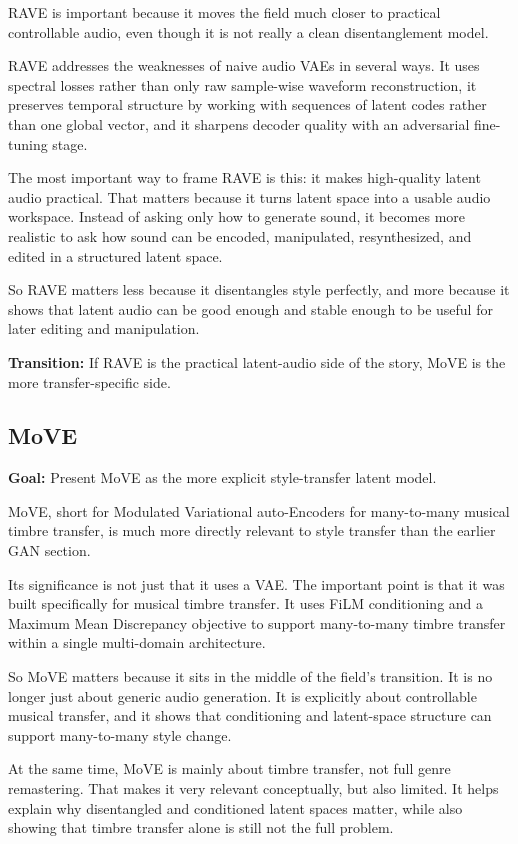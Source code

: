 \documentclass[11pt]{article}
\begin{document}
RAVE is important because it moves the field much closer to practical controllable audio, even though it is not really a clean disentanglement model.

RAVE addresses the weaknesses of naive audio VAEs in several ways. It uses spectral losses rather than only raw sample-wise waveform reconstruction, it preserves temporal structure by working with sequences of latent codes rather than one global vector, and it sharpens decoder quality with an adversarial fine-tuning stage.

The most important way to frame RAVE is this: it makes high-quality latent audio practical. That matters because it turns latent space into a usable audio workspace. Instead of asking only how to generate sound, it becomes more realistic to ask how sound can be encoded, manipulated, resynthesized, and edited in a structured latent space.

So RAVE matters less because it disentangles style perfectly, and more because it shows that latent audio can be good enough and stable enough to be useful for later editing and manipulation.

\textbf{Transition:} If RAVE is the practical latent-audio side of the story, MoVE is the more transfer-specific side.

\subsection*{MoVE}
\textbf{Goal:} Present MoVE as the more explicit style-transfer latent model.

MoVE, short for Modulated Variational auto-Encoders for many-to-many musical timbre transfer, is much more directly relevant to style transfer than the earlier GAN section.

Its significance is not just that it uses a VAE. The important point is that it was built specifically for musical timbre transfer. It uses FiLM conditioning and a Maximum Mean Discrepancy objective to support many-to-many timbre transfer within a single multi-domain architecture.

So MoVE matters because it sits in the middle of the field's transition. It is no longer just about generic audio generation. It is explicitly about controllable musical transfer, and it shows that conditioning and latent-space structure can support many-to-many style change.

At the same time, MoVE is mainly about timbre transfer, not full genre remastering. That makes it very relevant conceptually, but also limited. It helps explain why disentangled and conditioned latent spaces matter, while also showing that timbre transfer alone is still not the full problem.
\end{document}
